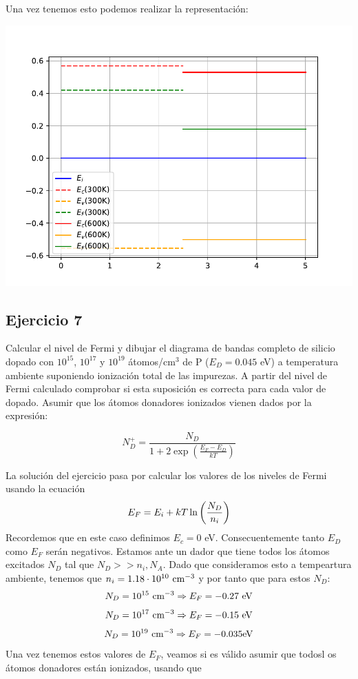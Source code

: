 Una vez tenemos esto podemos realizar la representación:
\begin{center}
	\includegraphics[width=0.9\linewidth]{Ejercicios/Ch_01/Ejercicio_01_7.pdf}
\end{center}


\begin{Enunciado}
\subsection*{Ejercicio 7}
Calcular el nivel de Fermi y dibujar el diagrama de bandas completo de silicio dopado con $10^{15}$, $10^{17}$ y $10^{19}$ átomos/cm$^3$ de P ($E_D = 0.045$ eV) a temperatura ambiente suponiendo ionización total de las impurezas. A partir del nivel de Fermi calculado comprobar si esta suposición es correcta para cada valor de dopado. Asumir que los átomos donadores ionizados vienen dados por la expresión:

\begin{equation}
	N_D^+ = \frac{N_D}{1 + 2 \exp \left( \frac{E_F - E_D}{kT} \right)}
\end{equation}
\end{Enunciado}

La solución del ejercicio pasa por calcular los valores de los niveles de Fermi usando la ecuación
\begin{equation}
	E_F = E_i + kT \ln \left( \frac{N_D}{n_i} \right)
\end{equation}
Recordemos que en este caso definimos $E_{c}=0$ eV. Consecuentemente tanto $E_D$ como $E_F$ serán negativos. Estamos ante un dador que tiene todos los átomos excitados $N_D$ tal que $N_D>>n_i,N_A$. Dado que consideramos esto a tempeartura ambiente, tenemos que $n_i=1.18\cdot 10^{10} \ \text{cm}^{-3}$ y por tanto que para estos $N_D$:
\begin{equation}
	N_D=10^{15} \ \text{cm}^{-3} \Rightarrow E_F = -0.27 \ \text{eV}
\end{equation}
\begin{equation}
	N_D=10^{17} \ \text{cm}^{-3} \Rightarrow E_F = -0.15  \ \text{eV}
\end{equation}
\begin{equation}
	N_D=10^{19} \ \text{cm}^{-3} \Rightarrow E_F = -0.035  \text{eV}
\end{equation}
Una vez tenemos estos valores de $E_F$, veamos si es válido asumir que todosl os átomos donadores están ionizados, usando que

